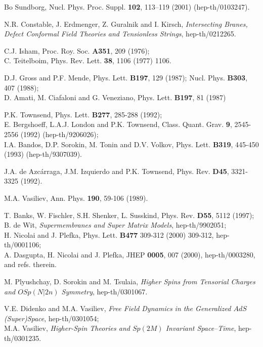 \documentclass[a4paper,11pt]{article}
\begin{document}
{\begin{thebibliography}{99}
Bo Sundborg, Nucl. Phys. Proc. Suppl. {\bf 102}, 113--119 (2001) 
(hep-th/0103247). 


N.R. Constable, J. Erdmenger, Z. Guralnik and I. Kirsch, 
{\sl Intersecting Branes, 
Defect Conformal Field Theories and Tensionless Strings}, 
hep-th/0212265. 

C.J. Isham, Proc. Roy. Soc. {\bf A351}, 209 (1976); \\ C. Teitelboim, 
Phys.  Rev. Lett. {\bf 38}, 1106 (1977) 1106. 

D.J. Gross and P.F. Mende,   
Phys. Lett. {\bf B197}, 129 (1987); 
 Nucl. Phys. {\bf B303}, 407 (1988); 
\\ D. Amati, M. Ciafaloni and G. Veneziano, 
Phys. Lett. {\bf B197}, 81 (1987) 


P.K. Townsend, 
Phys. Lett. {\bf B277}, 285-288 (1992); 
\\ E. Bergshoeff, L.A.J. London and P.K. Townsend, 
 Class. Quant. Grav. {\bf 9}, 2545-2556 (1992) (hep-th/9206026);  
\\ I.A. Bandos, D.P. Sorokin, M. Tonin and D.V. Volkov, 
Phys. Lett. {\bf B319}, 445-450 (1993) (hep-th/9307039). 

J.A. de Azc\'arraga, J.M. Izquierdo and P.K. Townsend,  
Phys. Rev. {\bf D45}, 3321-3325 (1992).  

M.A. Vasiliev, 
Ann. Phys. {\bf 190}, 59-106 (1989). 


  T. Banks, W. Fischler, S.H. Shenker, L. Susskind, 
 Phys. Rev. {\bf D55}, 5112  (1997);  
\\ 
 B. de Wit, {\sl Supermembranes and Super Matrix Models}, 
hep-th/9902051; \\ 
H. Nicolai and J. Plefka,  Phys. Lett. {\bf B477} 309-312 (2000) 309-312, 
hep-th/0001106; \\ 
 A. Dasgupta, H. Nicolai and J. Plefka,  
JHEP {\bf 0005}, 007 (2000), hep-th/0003280, and refs. therein.



 M. Plyushchay, D. Sorokin and M. Tsulaia, {\sl 
Higher Spins from Tensorial Charges and $OSp(N|2n)$ Symmetry}, 
hep-th/0301067. 

V.E. Didenko and M.A. Vasiliev, 
{\sl Free Field Dynamics in the Generalized $AdS$ (Super)Space}, 
hep-th/0301054; \\ M.A. Vasiliev, {\sl    
Higher-Spin Theories and $Sp(2M)$ Invariant Space--Time}, hep-th/0301235.

\end{thebibliography}
}
\end{document}

